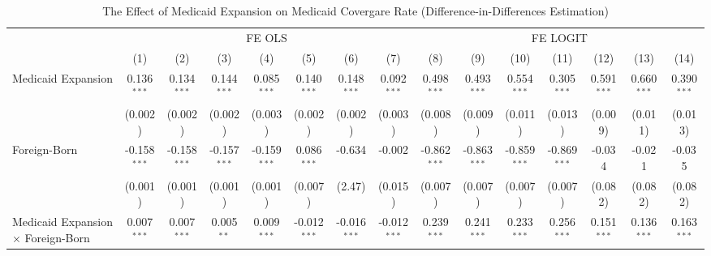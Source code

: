 \documentclass[
]{article}
\begin{document}
\newpage
\begin{landscape}

\begin{table}[htbp]
   \centering
   \large
   \begin{adjustbox}{width = 1.5\textwidth, center}
      \begin{threeparttable}[b]
         \caption{The Effect of Medicaid Expansion on Medicaid Covergare Rate (Difference-in-Differences Estimation)}
         \renewcommand*{\arraystretch}{1.75}
         \begin{tabular}{lcccccccccccccc}
            \tabularnewline \midrule \midrule
             & \multicolumn{7}{c}{FE OLS} & \multicolumn{7}{c}{FE LOGIT} \\ \cmidrule(lr){2-8} \cmidrule(lr){9-15}
                                                      & (1)            & (2)            & (3)            & (4)            & (5)            & (6)            & (7)            & (8)            & (9)            & (10)           & (11)           & (12)          & (13)          & (14)\\  
            \midrule 
            Medicaid Expansion                        & 0.136$^{***}$  & 0.134$^{***}$  & 0.144$^{***}$  & 0.085$^{***}$  & 0.140$^{***}$  & 0.148$^{***}$  & 0.092$^{***}$  & 0.498$^{***}$  & 0.493$^{***}$  & 0.554$^{***}$  & 0.305$^{***}$  & 0.591$^{***}$ & 0.660$^{***}$ & 0.390$^{***}$\\   
                                                      & (0.002)        & (0.002)        & (0.002)        & (0.003)        & (0.002)        & (0.002)        & (0.003)        & (0.008)        & (0.009)        & (0.011)        & (0.013)        & (0.009)       & (0.011)       & (0.013)\\   
            Foreign-Born                              & -0.158$^{***}$ & -0.158$^{***}$ & -0.157$^{***}$ & -0.159$^{***}$ & 0.086$^{***}$  & -0.634         & -0.002         & -0.862$^{***}$ & -0.863$^{***}$ & -0.859$^{***}$ & -0.869$^{***}$ & -0.034        & -0.021        & -0.035\\   
                                                      & (0.001)        & (0.001)        & (0.001)        & (0.001)        & (0.007)        & (2.47)         & (0.015)        & (0.007)        & (0.007)        & (0.007)        & (0.007)        & (0.082)       & (0.082)       & (0.082)\\   
            Medicaid Expansion $\times$ Foreign-Born  & 0.007$^{***}$  & 0.007$^{***}$  & 0.005$^{**}$   & 0.009$^{***}$  & -0.012$^{***}$ & -0.016$^{***}$ & -0.012$^{***}$ & 0.239$^{***}$  & 0.241$^{***}$  & 0.233$^{***}$  & 0.256$^{***}$  & 0.151$^{***}$ & 0.136$^{***}$ & 0.163$^{***}$\\   

\end{tabular}
\end{threeparttable}
\end{adjustbox}
\end{table}
\end{landscape}
\end{document}
